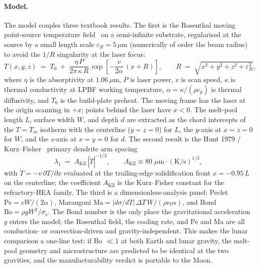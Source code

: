 \documentclass[11pt,a4paper]{article}
\begin{document}
\paragraph{Model.}
The model couples three textbook results. The first is the Rosenthal moving point-source temperature field~\cite{Rosenthal1946} on a semi-infinite substrate, regularised at the source by a small length scale $\varepsilon_R = 5\,\mu$m (numerically of order the beam radius) to avoid the $1/R$ singularity at the laser focus:
\begin{equation}
  T(x,y,z) \;=\; T_0 \;+\; \frac{\eta\,P}{2\pi\,\kappa\,R}\,
    \exp\!\left[-\frac{v}{2\alpha}\,(x + R)\right],
  \qquad
  R \;=\; \sqrt{x^2 + y^2 + z^2 + \varepsilon_R^{2}},
  \label{eq:rosenthal}
\end{equation}
where $\eta$ is the absorptivity at $1.06\,\mu$m, $P$ is laser power, $v$ is scan speed, $\kappa$ is thermal conductivity at LPBF working temperature, $\alpha = \kappa/(\rho c_p)$ is thermal diffusivity, and $T_0$ is the build-plate preheat. The moving frame has the laser at the origin scanning in $+x$; points behind the laser have $x<0$. The melt-pool length $L$, surface width $W$, and depth $d$ are extracted as the chord intercepts of the $T = T_m$ isotherm with the centerline ($y = z = 0$) for $L$, the $y$-axis at $x = z = 0$ for $W$, and the $z$-axis at $x = y = 0$ for $d$. The second result is the Hunt 1979 / Kurz--Fisher~\cite{Hunt1979,KurzFisher1986} primary dendrite arm spacing
\begin{equation}
  \lambda_1 \;=\; A_\text{KZ}\,|\dot T|^{-1/3},
  \qquad A_\text{KZ} \approx 80\;\mu\text{m}\!\cdot\!(\text{K/s})^{1/3},
  \label{eq:hunt}
\end{equation}
with $\dot T = -v\,\partial T/\partial x$ evaluated at the trailing-edge solidification front $x = -0.95\,L$ on the centerline; the coefficient $A_\text{KZ}$ is the Kurz--Fisher constant for the refractory-HEA family. The third is a dimensionless-analysis panel: Peclet $\mathrm{Pe} = vW/(2\alpha)$, Marangoni $\mathrm{Ma} = |d\sigma/dT|\,\Delta T\,W / (\rho\nu_l\alpha)$, and Bond $\mathrm{Bo} = \rho g W^2/\sigma_s$. The Bond number is the only place the gravitational acceleration $g$ enters the model; the Rosenthal field, the cooling rate, and Pe and Ma are all conduction- or convection-driven and gravity-independent. This makes the lunar comparison a one-line test: if Bo $\ll 1$ at both Earth and lunar gravity, the melt-pool geometry and microstructure are predicted to be identical at the two gravities, and the manufacturability verdict is portable to the Moon.
\end{document}

